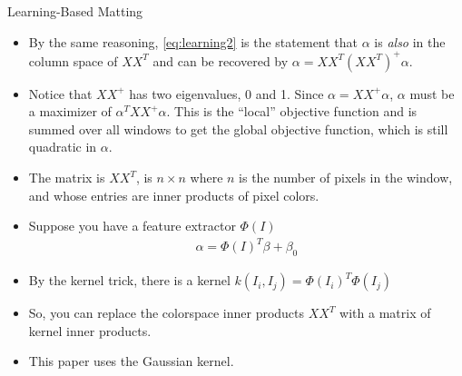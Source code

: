 \documentclass{beamer}
\begin{document}
\begin{frame}[allowframebreaks]{Learning-Based Matting \cite{zheng-learning}}
\begin{itemize}
        $\alpha = XX^+ \alpha$. This is true because (by assumption \eqref{eq:alphacolor}) $\alpha$
        is in the column space of $X$, and can therefore be recovered with the
        pseudoinverse.
  \item By the same reasoning, \eqref{eq:learning2} is the statement that
        $\alpha$ is \textit{also} in the column space of $XX^T$ and can be recovered by
        $\alpha = XX^T(XX^T)^+\alpha$.
  \item Notice that $XX^+$ has two eigenvalues, 0 and 1. Since $\alpha = XX^+ \alpha$,
        $\alpha$ must be a maximizer of $\alpha^T XX^+ \alpha$. This is the ``local''
        objective function and is summed over all windows to get the global objective
        function, which is still quadratic in $\alpha$.
  \item The matrix is $XX^T$, is $n \times n$ where $n$ is the number of
        pixels in the window, and whose entries are inner products of pixel colors.
  \item Suppose you have a feature extractor $\Phi(I)$
  \begin{align}
   \alpha = \Phi(I)^T \beta + \beta_0
  \end{align}
  \item By the kernel trick, there is a kernel $k(I_i,I_j) = \Phi(I_i)^T\Phi(I_j)$
  \item So, you can replace the colorspace inner products $XX^T$ with a matrix of
        kernel inner products.
  \item This paper uses the Gaussian kernel.
 \end{itemize}
\end{frame}
\end{document}
